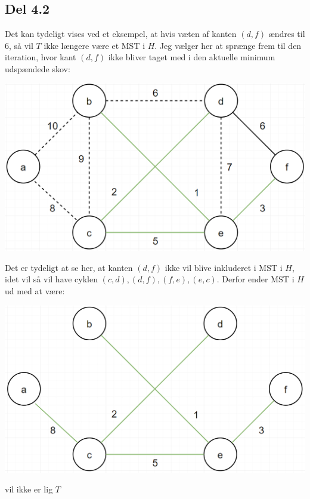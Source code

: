 \documentclass{report}
\begin{document}
\subsection*{Del 4.2}
Det kan tydeligt vises ved et eksempel, at hvis væten af kanten $(d, f)$ ændres til 6, så vil $T$ ikke længere være et MST i $H$. Jeg vælger her at sprænge frem til den iteration, hvor kant $(d, f)$ ikke bliver taget med i den aktuelle minimum udspændede skov:
\begin{center}
    \includegraphics[height = 5 cm]{../entities/new_kruskal1}
\end{center}
Det er tydeligt at se her, at kanten $(d, f)$ ikke vil blive inkluderet i MST i $H$, idet vil så vil have cyklen $(c, d), (d, f), (f, e), (e, c)$. Derfor ender MST i $H$ ud med at være:
\begin{center}
    \includegraphics[height = 5 cm]{../entities/new_kruskal2}
\end{center}
vil ikke er lig $T$

\newpage
\end{document}
